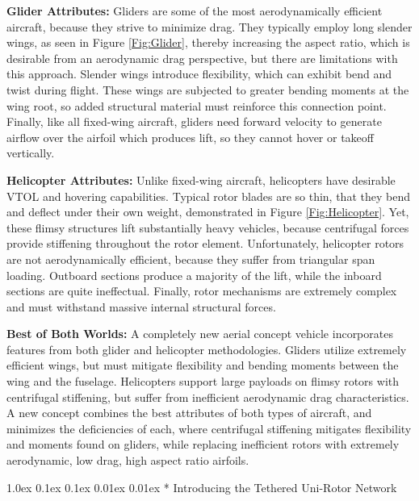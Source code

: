 \documentclass[11pt]{article}
\makeatletter
\renewcommand\subsection{
\@startsection{subsection}{2}{\z@}%
{1.0ex \@plus 0.1ex \@minus 0.1ex}%
{0.01ex \@plus 0.01ex}%
{\normalfont\Large\bfseries}}
\makeatother
\begin{document}
{\color{green} \bf Glider Attributes:}
Gliders are some of the most aerodynamically efficient aircraft, because they strive to minimize drag.  They typically employ long slender wings, as seen in Figure \ref{Fig:Glider}, thereby increasing the aspect ratio, which is desirable from an aerodynamic drag perspective, but there are limitations with this approach.  Slender wings introduce flexibility, which can exhibit bend and twist during flight.  These wings are subjected to greater bending moments at the wing root, so added structural material must reinforce this connection point.  Finally, like all fixed-wing aircraft, gliders need forward velocity to generate airflow over the airfoil which produces lift, so they cannot hover or takeoff vertically.


{\color{green} \bf Helicopter Attributes:}
Unlike fixed-wing aircraft, helicopters have desirable VTOL and hovering capabilities.  Typical rotor blades are so thin, that they bend and deflect under their own weight, demonstrated in Figure \ref{Fig:Helicopter}.  Yet, these flimsy structures lift substantially heavy vehicles, because centrifugal forces provide stiffening throughout the rotor element.  Unfortunately, helicopter rotors are not aerodynamically efficient, because they suffer from triangular span loading.  Outboard sections produce a majority of the lift, while the inboard sections are quite ineffectual.  Finally, rotor mechanisms are extremely complex and must withstand massive internal structural forces.


{\color{green} \bf Best of Both Worlds:}
A completely new aerial concept vehicle incorporates features from both glider and helicopter methodologies.  Gliders utilize extremely efficient wings, but must mitigate flexibility and bending moments between the wing and the fuselage.  Helicopters support large payloads on flimsy rotors with centrifugal stiffening, but suffer from inefficient aerodynamic drag characteristics.  A new concept combines the best attributes of both types of aircraft, and minimizes the deficiencies of each, where centrifugal stiffening mitigates flexibility and moments found on gliders, while replacing inefficient rotors with extremely aerodynamic, low drag, high aspect ratio airfoils.




\subsection*{\color{green} Introducing the Tethered Uni-Rotor Network}
\end{document}
